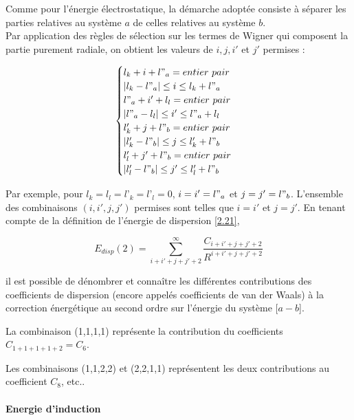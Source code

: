 	Comme pour l'énergie électrostatique, la démarche adoptée consiste à séparer les parties relatives au système $a$ de celles relatives au système $b$. \\
	
	Par application des règles de sélection sur les termes de Wigner qui composent la partie purement radiale, on obtient les valeurs de $i, j, i'$ et $j'$ permises :
	
	\begin{equation}
	\begin{cases}
	l_{k} + i + l"_{a} = entier\ pair \\
	|l_{k} - l"_{a}| \leq i \leq l_{k} + l"_{a} \\
	l"_{a} + i' + l_{l} = entier\ pair \\
	|l"_{a} - l_{l}| \leq i' \leq l"_{a} + l_{l} \\
	l'_{k} + j + l"_{b} = entier\ pair \\
	|l'_{k} - l"_{b}| \leq j \leq l'_{k} + l"_{b} \\
	l'_{l} + j' + l"_{b} = entier\ pair \\
	|l'_{l} - l"_{b}| \leq j' \leq l'_{l} + l"_{b}
	\end{cases}
	\end{equation}
	
	Par exemple, pour $l_{k}=l_{l}=l’_{k}=l’_{l}=0$, $i=i'=l"_{a}$ et $j=j'=l"_{b}$. L'ensemble des combinaisons $(i, i', j, j')$ permises sont telles que $i=i'$ et $j=j'$. En tenant compte de la définition de l'énergie de dispersion \ref{2.21},
	
	\begin{equation}
	E_{disp}(2) = \sum_{i+i'+j+j'+2}^{\infty} \frac{C_{i+i'+j+j'+2}}{R^{i+i'+j+j'+2}}
	\end{equation}
	
	il est possible de dénombrer et connaître les différentes contributions des coefficients de dispersion (encore appelés coefficients de van der Waals) à la correction énergétique au second ordre sur l'énergie du système [$a - b$].
	
	La combinaison (1,1,1,1) représente la contribution du coefficients $C_{1+1+1+1+2} = C_{6}$.
	
	Les combinaisons (1,1,2,2) et (2,2,1,1) représentent les deux contributions au coefficient $C_{8}$, etc..
	
	
	\paragraph{Energie d’induction}
	
